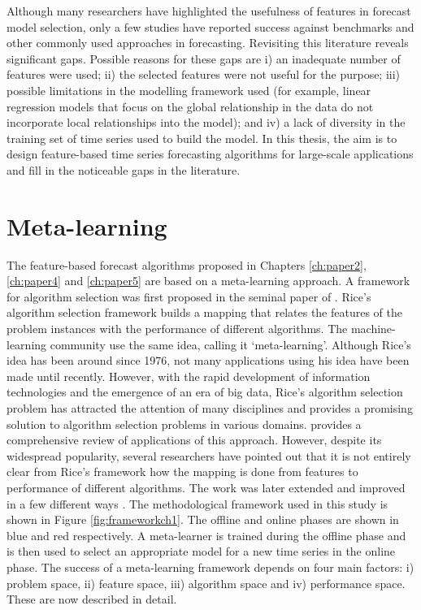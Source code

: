 \documentclass{monashthesis}
\begin{document}
Although many researchers have highlighted the usefulness of features in forecast model selection, only a few studies have reported success against benchmarks and other commonly used approaches in forecasting. Revisiting this literature reveals significant gaps. Possible reasons for these gaps are i) an inadequate number of features were used; ii) the selected features were not useful for the purpose; iii) possible limitations in the modelling framework used (for example, linear regression models that focus on the global relationship in the data do not incorporate local relationships into the model); and iv) a lack of diversity in the training set of time series used to build the model. In this thesis, the aim is to design feature-based time series forecasting algorithms for large-scale applications and fill in the noticeable gaps in the literature.

\hypertarget{meta-learning}{%
\section{Meta-learning}\label{meta-learning}}

The feature-based forecast algorithms proposed in Chapters \ref{ch:paper2}, \ref{ch:paper4} and \ref{ch:paper5} are based on a meta-learning approach.
A framework for algorithm selection was first proposed in the seminal paper of \textcite{rice1976}. Rice's algorithm selection framework builds a mapping that relates the features of the problem instances with the performance of different algorithms. The machine-learning community use the same idea, calling it `meta-learning'. Although Rice's idea has been around since 1976, not many applications using his idea have been made until recently. However, with the rapid development of information technologies and the emergence of an era of big data, Rice's algorithm selection problem has attracted the attention of many disciplines and provides a promising solution to algorithm selection problems in various domains. \textcite{smith2009cross} provides a comprehensive review of applications of this approach. However, despite its widespread popularity, several researchers have pointed out that it is not entirely clear from Rice's framework how the mapping is done from features to performance of different algorithms. The work was later extended and improved in a few different ways \autocites{smith2012measuring}{kotthoff2016algorithm}. The methodological framework used in this study is shown in Figure \ref{fig:frameworkch1}. The offline and online phases are shown in blue and red respectively. A meta-learner is trained during the offline phase and is then used to select an appropriate model for a new time series in the online phase. The success of a meta-learning framework depends on four main factors: i) problem space, ii) feature space, iii) algorithm space and iv) performance space. These are now described in detail.
\end{document}
